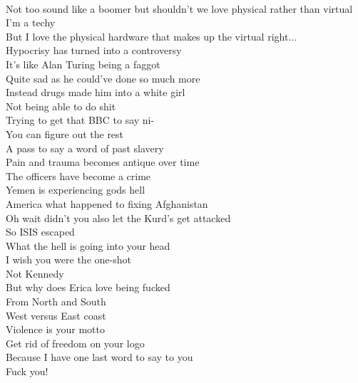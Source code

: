 \documentclass[12pt, b5paper]{article}
\begin{document}
\\Not too sound like a boomer but shouldn't we love physical rather than virtual
\\I'm a techy
\\But I love the physical hardware that makes up the virtual right...
\\Hypocrisy has turned into a controversy
\\It's like Alan Turing being a faggot
\\Quite sad as he could've done so much more
\\Instead drugs made him into a white girl
\\Not being able to do shit
\\Trying to get that BBC to say ni-
\\You can figure out the rest
\\A pass to say a word of past slavery
\\Pain and trauma becomes antique over time
\\The officers have become a crime
\\Yemen is experiencing gods hell
\\America what happened to fixing Afghanistan
\\Oh wait didn't you also let the Kurd's get attacked
\\So ISIS escaped
\\What the hell is going into your head
\\I wish you were the one-shot
\\Not Kennedy
\\But why does Erica love being fucked
\\From North and South
\\West versus East coast
\\Violence is your motto
\\Get rid of freedom on your logo
\\Because I have one last word to say to you
\\Fuck you!

\newpage

\end{document}
